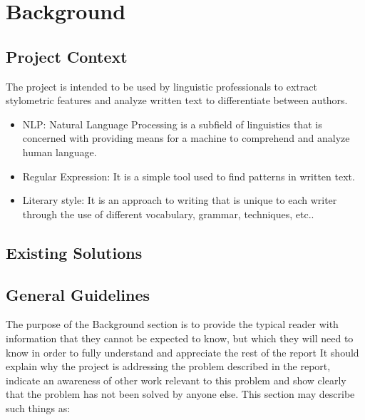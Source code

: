 \chapter{Background}

\section{Project Context}
The project is intended to be used by linguistic professionals to extract stylometric features and analyze written text to differentiate between authors.

\begin{itemize}
    \item NLP: Natural Language Processing is a subfield of linguistics that is concerned with providing means for a machine to comprehend and analyze human language.
    \item Regular Expression: It is a simple tool used to find patterns in written text.
    \item Literary style: It is an approach to writing that is unique to each writer through the use of different vocabulary, grammar, techniques, etc..
\end{itemize}

\section{Existing Solutions}


\section{General Guidelines}
The purpose of the Background section is to provide the typical reader with information that they cannot be expected to know, but which they will need to know in order to fully
understand and appreciate the rest of the report
It should explain why the project is addressing the problem described in the
report, indicate an awareness of other work relevant to this problem and show clearly that the
problem has not been solved by anyone else. This section may describe such things as:


